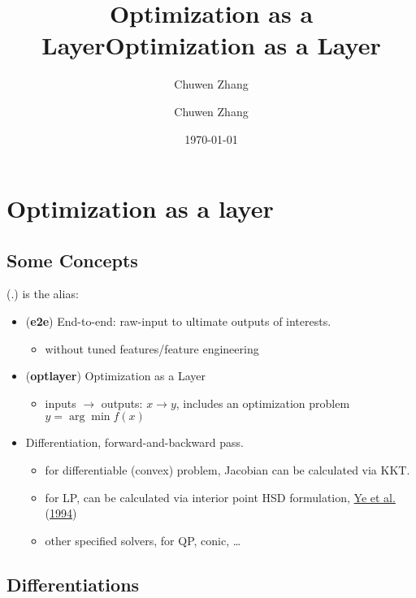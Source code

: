 \documentclass[
  10pt,
  a4paper,
,tablecaptionabove
]{scrartcl}
\title{Optimization as a Layer}
\author{Chuwen Zhang}
\date{\today}
\title{Optimization as a Layer}
\author{Chuwen Zhang}
\providecommand{\tightlist}{%
  \setlength{\itemsep}{0pt}\setlength{\parskip}{0pt}}
\begin{document}




\hypertarget{optimization-as-a-layer}{%
\section{Optimization as a layer}\label{optimization-as-a-layer}}

\hypertarget{some-concepts}{%
\subsection{Some Concepts}\label{some-concepts}}

(.) is the alias:

\begin{itemize}
\tightlist
\item
  (\textbf{e2e}) End-to-end: raw-input to ultimate outputs of interests.

  \begin{itemize}
  \tightlist
  \item
    without tuned features/feature engineering
  \end{itemize}
\item
  (\textbf{optlayer}) Optimization as a Layer

  \begin{itemize}
  \tightlist
  \item
    inputs \(\to\) outputs: \(x\to y\), includes an optimization problem
    \(y = \arg \min f(x)\)
  \end{itemize}
\item
  Differentiation, forward-and-backward pass.

  \begin{itemize}
  \tightlist
  \item
    for differentiable (convex) problem, Jacobian can be calculated via
    KKT.
  \item
    for LP, can be calculated via interior point HSD formulation,
    \protect\hyperlink{ref-ye_o_1994}{Ye et al.}
    (\protect\hyperlink{ref-ye_o_1994}{1994})
  \item
    other specified solvers, for QP, conic, \ldots{}
  \end{itemize}
\end{itemize}

\hypertarget{differentiations}{%
\subsection{Differentiations}\label{differentiations}}
\end{document}
